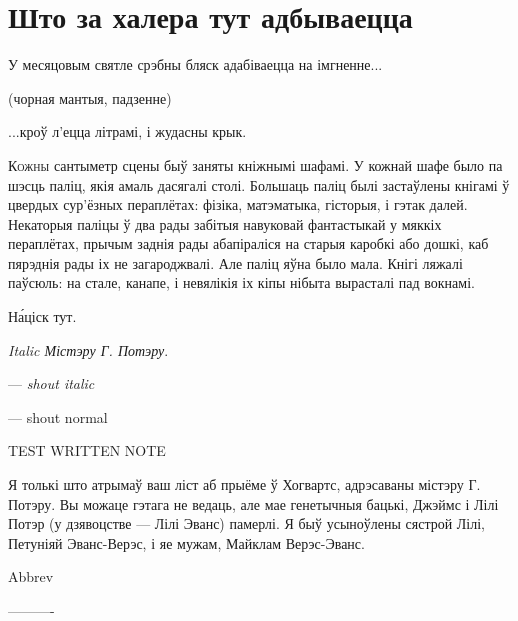 \chapter{Што за халера тут адбываецца}

\begin{chapterOpeningQuote}
    \noindent
    У месяцовым святле срэбны бляск адабіваецца на імгненне...
    
    \vspace*{2ex}
    (чорная мантыя, падзенне)
    
    \vspace*{2ex}
    ...кроў л'ецца літрамі, і жудасны крык.
\end{chapterOpeningQuote}


\lettrine{К}{ожны} сантыметр сцены быў заняты кніжнымі шафамі.
У кожнай шафе было па шэсць паліц, якія амаль дасягалі столі.
Большаць паліц былі застаўлены кнігамі ў цвердых сур'ёзных пераплётах: фізіка, матэматыка, гісторыя,
і гэтак далей. Некаторыя паліцы ў два рады забітыя навуковай фантастыкай у мяккіх пераплётах, прычым 
заднія рады абапіраліся на старыя каробкі або дошкі, каб пярэднія рады іх не загароджвалі.
Але паліц яўна было мала. Кнігі ляжалі паўсюль: на стале, канапе, і невялікія іх кіпы нібыта вырасталі 
пад вокнамі. 


Н\'аціск тут.

\emph{Italic Містэру Г. Потэру}.


--- \emph{shout italic }

--- shout normal 

TEST WRITTEN NOTE



\begin{writtenNote}

    Я толькі што атрымаў ваш ліст аб прыёме ў Хогвартс, адрэсаваны містэру Г. Потэру. Вы можаце
гэтага не ведаць, але мае генетычныя бацькі, Джэймс і Лілі Потэр (у дзявоцстве --- Лілі Эванс)
памерлі. Я быў усыноўлены сястрой Лілі, Петуніяй Эванс-Верэс, і яе мужам, Майклам Верэс-Эванс.


\end{writtenNote}


Abbrev   

----------

